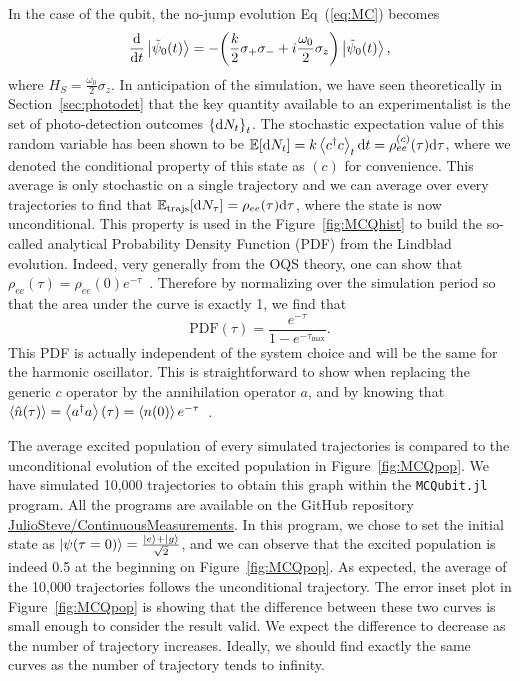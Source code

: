 In the case of the qubit, the no-jump evolution Eq~(\ref{eq:MC}) becomes
\begin{equation}\label{eq:MCphotodet}
    \frac{\mathrm{d}}{\mathrm{d}t}\ket{\tilde{\psi}_0(t)} = -\qty(\frac{k}{2}\sigma_+ \sigma_- + i\frac{\omega_0}{2}\sigma_z)\ket{\tilde{\psi}_0(t)},
\end{equation}
where $H_S = \frac{\omega_0}{2}\sigma_z$. In anticipation of the simulation, we have seen theoretically in Section~\ref{sec:photodet} that the key quantity available to an experimentalist is the set of photo-detection outcomes $\qty{\mathrm{d}N_t}_t$. The stochastic expectation value of this random variable has been shown to be $\mathbb{E}\qty[\mathrm{d}N_t]=k\expval{c^\dagger c}_t \mathrm{d}t = \rho_{ee}^{(c)}(\tau)\mathrm{d}\tau$, where we denoted the conditional property of this state as $(c)$ for convenience. This average is only stochastic on a single trajectory and we can average over every trajectories to find that $\mathbb{E}_\mathrm{trajs}\qty[\mathrm{d}N_\tau]=\rho_{ee}(\tau) \mathrm{d}\tau$, where the state is now unconditional. This property is used in the Figure~\ref{fig:MCQhist} to build the so-called analytical Probability Density Function (PDF) from the Lindblad evolution. Indeed, very generally from the OQS theory, one can show that $\rho_{ee}(\tau)=\rho_{ee}(0)e^{-\tau}$~\cite{Breuer}. Therefore by normalizing over the simulation period so that the area under the curve is exactly 1, we find that
\begin{equation}\label{eq:PDF}
    \mathrm{PDF}(\tau) = \frac{e^{-\tau}}{1-e^{-\tau_\mathrm{max}}}.
\end{equation}
This PDF is actually independent of the system choice and will be the same for the harmonic oscillator. This is straightforward to show when replacing the generic $c$ operator by the annihilation operator $a$, and by knowing that $\expval{\hat{n}(\tau)}=\expval{a^\dagger a}(\tau)=\expval{n(0)}e^{-\tau}$~\cite{Breuer}.

The average excited population of every simulated trajectories is compared to the unconditional evolution of the excited population in Figure~\ref{fig:MCQpop}. We have simulated 10,000 trajectories to obtain this graph within the \verb|MCQubit.jl| program. All the programs are available on the GitHub repository \href{https://github.com/JulioSteve/ContinuousMeasurements}{JulioSteve/\allowbreak ContinuousMeasurements}. In this program, we chose to set the initial state as $\ket{\psi(\tau=0)}=\frac{\ket{e}+\ket{g}}{\sqrt{2}}$, and we can observe that the excited population is indeed 0.5 at the beginning on Figure~\ref{fig:MCQpop}. As expected, the average of the 10,000 trajectories follows the unconditional trajectory. The error inset plot in Figure~\ref{fig:MCQpop} is showing that the difference between these two curves is small enough to consider the result valid. We expect the difference to decrease as the number of trajectory increases. Ideally, we should find exactly the same curves as the number of trajectory tends to infinity. 

